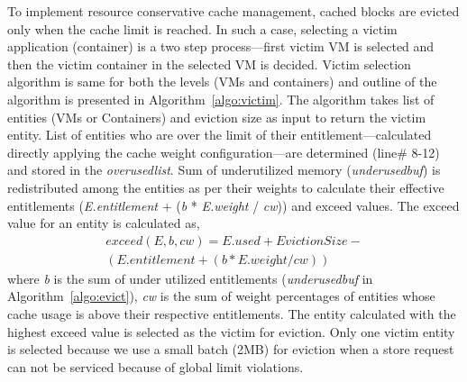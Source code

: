 %
To implement resource conservative cache management,
cached blocks are evicted only when the \dd{} cache limit is reached.
%
In such a case, selecting a victim application (container) is a two step process---first victim
VM is selected and then the victim container in the selected VM is 
decided.
%
Victim selection algorithm is same for both the levels (VMs and containers) and outline of 
the algorithm is presented in Algorithm~\ref{algo:victim}.
% 
The algorithm takes list of entities (VMs or Containers) and eviction size 
as input to return the victim entity.
%
List of entities who are over the limit of their entitlement---calculated directly
applying the \dd{} cache weight configuration---are determined (line\# 8-12) and
stored in the \textit{overusedlist}.  
%
Sum of underutilized memory (\textit{underusedbuf}) is redistributed among
the entities as per their weights to calculate their effective entitlements 
(\textit{E.entitlement} + (\textit{b} * \textit{E.weight} / \textit{cw}))
and exceed values.
%
The exceed value for an entity is calculated as,
\begin{equation}
\begin{aligned}
exceed(\textit{E}, \textit{b}, \textit{cw}) = \textit{E.used} + \textit{EvictionSize} - \\
                                              (\textit{E.entitlement} + (\textit{b} * \textit{E.weight} / \textit{cw}))
\end{aligned}
\end{equation}
where \textit{b} is the sum of under utilized entitlements (\textit{underusedbuf} in
Algorithm~\ref{algo:evict}), \textit{cw} is the sum of weight percentages of entities whose cache
usage is above their respective entitlements.
%
The entity calculated with the highest exceed value is selected as the 
victim for eviction.
%
Only one victim entity is selected because 
we use a small batch (2MB) for eviction when a store request can not be
serviced because of global limit violations.
